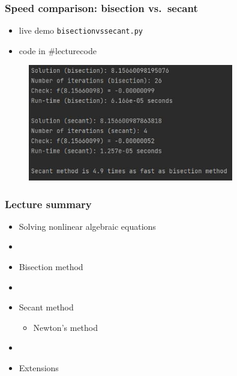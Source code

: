 \documentclass[english,14pt]{beamer}
\begin{document}

\begin{frame}[fragile]

\frametitle{Speed comparison: bisection vs.~secant}

\begin{itemize}
	\item live demo \texttt{bisectionvssecant.py}
	\item code in \#lecturecode
\end{itemize}

\begin{figure}[ht]
	\centering
	\includegraphics[width=0.8\textwidth]{figures/BisectionSecantSpeed}
\end{figure}

\end{frame}


\begin{frame}[fragile]

\frametitle{Lecture summary}
\begin{itemize}
	\item Solving nonlinear algebraic equations

	\item[]
	
	\item Bisection method

	\item[]
	
	\item Secant method
	\begin{itemize}
		\item Newton's method
	\end{itemize}

	\item[]
	
	\item Extensions
	
\end{itemize}

\end{frame}
\end{document}
